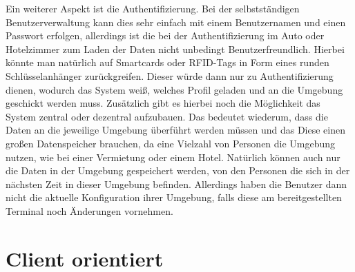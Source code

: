 Ein weiterer Aspekt ist die Authentifizierung. Bei der selbstständigen Benutzerverwaltung kann dies sehr einfach mit einem Benutzernamen und einen Passwort erfolgen, allerdings ist die bei der Authentifizierung im Auto oder Hotelzimmer zum Laden der Daten nicht unbedingt Benutzerfreundlich. Hierbei könnte man natürlich auf Smartcards oder RFID-Tags in Form eines runden Schlüsselanhänger zurückgreifen. Dieser würde dann nur zu Authentifizierung dienen, wodurch das System weiß, welches Profil geladen und an die Umgebung geschickt werden muss. Zusätzlich gibt es hierbei noch die Möglichkeit das System zentral oder dezentral aufzubauen. Das bedeutet wiederum, dass die Daten an die jeweilige Umgebung überführt werden müssen und das Diese einen großen Datenspeicher brauchen, da eine Vielzahl von Personen die Umgebung nutzen, wie bei einer Vermietung oder einem Hotel. Natürlich können auch nur die Daten in der Umgebung gespeichert werden, von den Personen die sich in der nächsten Zeit in dieser Umgebung befinden. Allerdings haben die Benutzer dann nicht die aktuelle Konfiguration ihrer Umgebung, falls diese am bereitgestellten Terminal noch Änderungen vornehmen.  

\section{Client orientiert}

